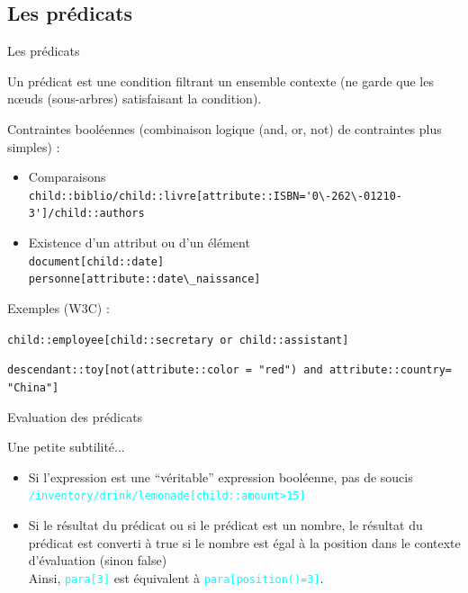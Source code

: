 \subsection{Les prédicats}

\begin{frame}{Les prédicats}

Un prédicat est une condition filtrant un ensemble contexte (ne garde que les n{\oe}uds (sous-arbres) satisfaisant la condition).\\

\medskip


Contraintes booléennes (combinaison logique (and, or, not) de contraintes plus simples) :
\begin{itemize}
\item Comparaisons \\
	\verb?child::biblio/child::livre[attribute::ISBN='0\-262\-01210-3']/child::authors?
\item Existence d'un attribut ou d'un élément \\
	\verb?document[child::date]?\\
	\verb?personne[attribute::date\_naissance]?
\end{itemize}


\bigskip

Exemples (W3C) :\\

\smallskip

\verb?child::employee[child::secretary or child::assistant]?\\

\smallskip

\verb?descendant::toy[not(attribute::color = "red") and attribute::country= "China"]?

\end{frame}


\begin{frame}{Evaluation des prédicats}

Une petite subtilité...

\begin{itemize}
\item Si l'expression est une ``véritable'' expression booléenne, pas de soucis\\
\textcolor{cyan}{\verb?/inventory/drink/lemonade[child::amount>15]?}
\item Si le résultat du prédicat ou si le prédicat est un nombre, le résultat du prédicat est converti à true si le nombre est égal à la position dans le contexte d'évaluation (sinon false)\\
Ainsi, \textcolor{cyan}{\verb?para[3]?} est équivalent à \textcolor{cyan}{\verb?para[position()=3]?}.
\end{itemize}
\end{frame}

